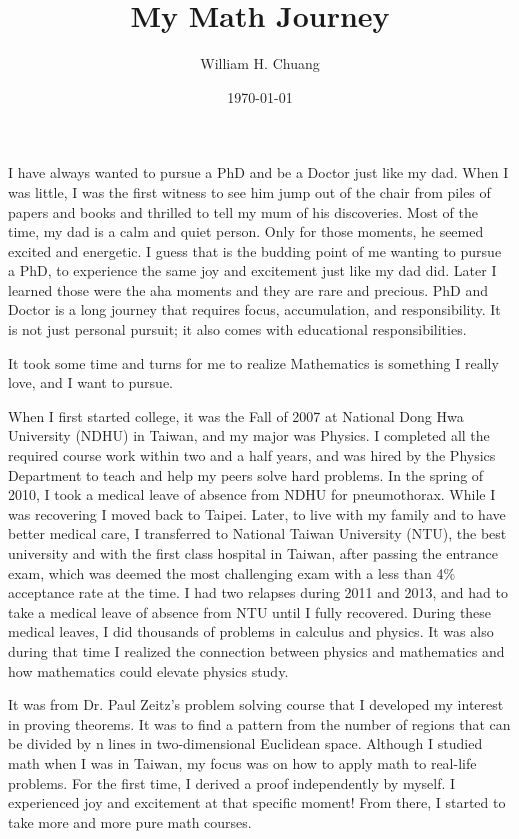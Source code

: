 \documentclass[11pt]{amsart}
\begin{document}
\title{My Math Journey}
\author{William H. Chuang}
\date{\today}
\maketitle


I have always wanted to pursue a PhD and be a Doctor just like my dad. When I was little, I was the first witness to see him jump out of the chair from piles of papers and books and thrilled to tell my mum of his discoveries. Most of the time, my dad is a calm and quiet person. Only for those moments, he seemed excited and energetic. I guess that is the budding point of me wanting to pursue a PhD, to experience the same joy and excitement just like my dad did. Later I learned those were the aha moments and they are rare and precious. PhD and Doctor is a long journey that requires focus, accumulation, and responsibility. It is not just personal pursuit; it also comes with educational responsibilities. 

It took some time and turns for me to realize Mathematics is something I really love, and I want to pursue.

When I first started college, it was the Fall of 2007 at National Dong Hwa University (NDHU) in Taiwan, and my major was Physics. I completed all the required course work within two and a half years, and was hired by the Physics Department to teach and help my peers solve hard problems. In the spring of 2010, I took a medical leave of absence from NDHU for pneumothorax. While I was recovering I moved back to Taipei. Later, to live with my family and to have better medical care, I transferred to National Taiwan University (NTU), the best university and with the first class hospital in Taiwan, after passing the entrance exam, which was deemed the most challenging exam with a less than 4$\%$ acceptance rate at the time.  I had two relapses during 2011 and 2013, and had to take a medical leave of absence from NTU until I fully recovered. During these medical leaves, I did thousands of problems in calculus and physics. It was also during that time I realized the connection between physics and mathematics and how mathematics could elevate physics study.


It was from Dr. Paul Zeitz’s problem solving course that I developed my interest in proving theorems. It was to find a pattern from the number of regions that can be divided by n lines in two-dimensional Euclidean space. Although I studied math when I was in Taiwan, my focus was on how to apply math to real-life problems. For the first time, I derived a proof independently by myself. I experienced joy and excitement at that specific moment! From there, I started to take more and more pure math courses.
\end{document}
